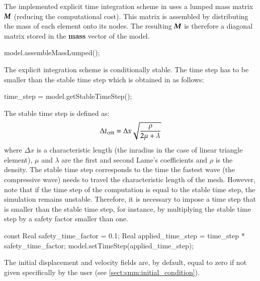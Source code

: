 The implemented explicit time integration scheme in \akantu uses a
lumped mass matrix $\boldsymbol{M}$ (reducing the computational cost). This
matrix is assembled by distributing the mass of each element onto its
nodes. The resulting $\boldsymbol{M}$ is therefore a diagonal matrix stored
in the \textbf{mass} vector of the model.


\begin{cpp} 
  model.assembleMassLumped();
\end{cpp} 
The explicit integration scheme is conditionally stable. The time step
has to be smaller than the stable time step which is obtained in
\akantu as follows:

\begin{cpp} 
time_step = model.getStableTimeStep();
\end{cpp} 

The stable time step is defined as:
\begin{equation}
\label{eqn:smm:explicit:stabletime} 
\Delta t_{{\mathrm{crit}}} = \Delta x \sqrt{\frac{\rho}{2 \mu + \lambda}}
\end{equation} 
where $\Delta x$ is a characteristic length (\eg the
inradius in the case of linear triangle element), $\mu$ and $\lambda$
are the first and second Lame's coefficients and $\rho$ is the
density.  The stable time step corresponds to the time the fastest
wave (the compressive wave) needs to travel the characteristic length
of the mesh.  However, note that if the time step of the computation
is equal to the stable time step, the simulation remains
unstable. Therefore, it is necessary to impose a time step that is
smaller than the stable time step, for instance, by multiplying the
stable time step by a safety factor smaller than one.

\begin{cpp} 
const Real safety_time_factor = 0.1; 
Real applied_time_step = time_step * safety_time_factor;
model.setTimeStep(applied_time_step);
\end{cpp} 
The initial displacement and velocity fields are, by default, equal to
zero if not given specifically by the user (see
\ref{sect:smm:initial_condition}).

